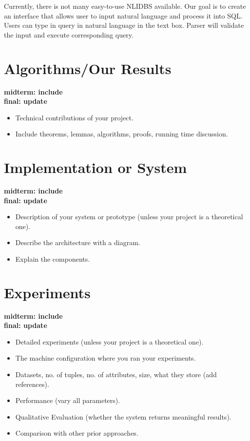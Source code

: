 \documentclass[twocolumn]{article}
\newcommand{\red}[1]{{\bf \color{red}#1}}
\newcommand{\blue}[1]{{\bf \color{blue}#1}}
\begin{document}
\begin{itemize}
	Currently, there is not many easy-to-use NLIDBS available. Our goal is to create an interface that allows user to input natural language and process it into SQL. Users can type in query in natural language in the text box. Parser will validate the input and execute corresponding query.\\
\end{itemize}


\section{Algorithms/Our Results}
\blue{
midterm: include\\
final: update\\
}

\red{
\begin{itemize}
\itemsep0em
\item Technical contributions of your project.
\item Include theorems, lemmas, algorithms, proofs, running time discussion.
\end{itemize}
}

\section{Implementation or System}
\blue{
midterm: include\\
final: update\\
}

\red{
\begin{itemize}
\itemsep0em
\item Description of your system or prototype (unless your project is a theoretical one).
\item Describe the architecture with a diagram.
\item Explain the components.
\end{itemize}
}


\section{Experiments}
\blue{
midterm: include\\
final: update\\
}

\red{
\begin{itemize}
\itemsep0em
\item Detailed experiments (unless your project is a theoretical one).
\item The machine configuration where you ran your experiments.
\item Datasets, no. of tuples, no. of attributes, size, what they store (add references).
\item Performance (vary all parameters).
\item Qualitative Evaluation (whether the system returns meaningful results).
\item Comparison with other prior approaches.
\end{itemize}
}
\end{document}
